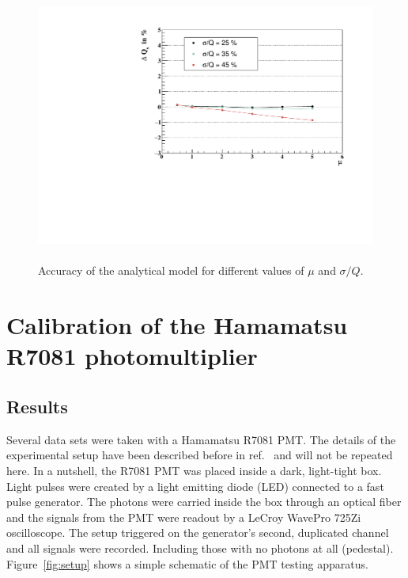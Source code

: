 \documentclass[preprint,12pt]{elsarticle}
\begin{document}
\begin{figure}[!t]
\centering
\includegraphics[width=12.0cm, height=8.25cm]{figures/DQs.pdf} \\
\caption{ Accuracy of the analytical model for different values of $\mu$ and $\sigma/Q$. }
\label{fig:dev}
\end{figure}


\section{Calibration of the Hamamatsu R7081 photomultiplier}
\label{sec:res}

\subsection{Results}

Several data sets were taken with a Hamamatsu R7081 PMT. 
The details of the experimental setup have been described before in ref.~\cite{me} and will not be repeated here. 
In a nutshell, the R7081 PMT was placed inside a dark, light-tight box. Light pulses were created by a light emitting diode (LED) connected to a fast pulse generator. 
The photons were carried inside the box through an optical fiber and the signals from the PMT were readout by a LeCroy WavePro 725Zi oscilloscope.   
The setup triggered on the generator's second, duplicated channel and all signals were recorded. Including those with no photons at all (pedestal). 
Figure~\ref{fig:setup} shows a simple schematic of the PMT testing apparatus. 
\end{document}
